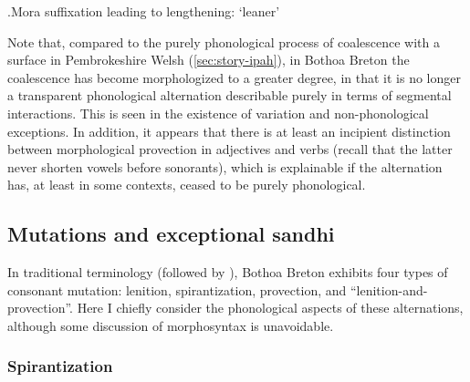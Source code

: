 \ex.\label{kastisoch-tableau}Mora suffixation leading to lengthening: \ipa{[kasˈtiːɒh]} `leaner'\\
\begin{OTtableau}{4}
\end{OTtableau}

Note that, compared to the purely phonological process of coalescence with a surface \ipa{[h]} in Pembrokeshire Welsh (\cref{sec:story-ipah}), in Bothoa Breton the coalescence has become morphologized to a greater degree, in that it is no longer a transparent phonological alternation describable purely in terms of segmental interactions. This is seen in the existence of variation and non\hyp phonological exceptions. In addition, it appears that there is at least an incipient distinction between morphological provection in adjectives and verbs (recall that the latter never shorten vowels before sonorants), which is explainable if the alternation has, at least in some contexts, ceased to be purely phonological.


\subsection{Mutations and exceptional sandhi}
\label{sec:mutations-sandhi}

In traditional terminology (followed by \citealt{humphreys95:_phonol_bothoa_saint_nicol_pelem}), Bothoa Breton exhibits four types of consonant mutation: lenition, spirantization, provection, and \enquote{lenition\hyp and\hyp provection}. Here I chiefly consider the phonological aspects of these alternations, although some discussion of morphosyntax is unavoidable.

\subsubsection{Spirantization}
\label{sec:spirantization}

